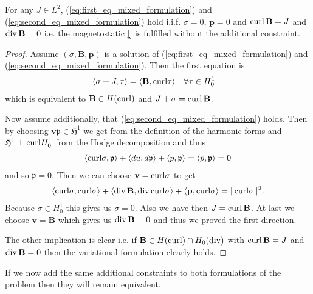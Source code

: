 \documentclass[../master_thesis.tex]{subfiles}
\begin{document}
\begin{proposition}
    For any $J \in L^2$, (\ref{eq:first_eq_mixed_formulation}) and 
    (\ref{eq:second_eq_mixed_formulation}) hold i.i.f. 
    $\sigma = 0$, $\mathbf{p}=0$ and $\operatorname{curl} \mathbf{B} = J$ and 
    $\operatorname{div} \mathbf{B} = 0$
    i.e. the magnetostatic \ref{}  is fulfilled without the additional 
    constraint.
\end{proposition}
\begin{proof}
    Assume $(\sigma,\mathbf{B},\mathbf{p})$ is a solution of (\ref{eq:first_eq_mixed_formulation}) and 
    (\ref{eq:second_eq_mixed_formulation}). Then the first equation is
    \begin{align*}
        \langle \sigma + J, \tau \rangle  
        &=  \langle \mathbf{B}, \mathbf{\operatorname{curl}}\tau \rangle  \quad \forall \tau \in H^1_0
    \end{align*}
    which is equivalent to $\mathbf{B} \in H(\operatorname{curl})$ and $J + \sigma = \operatorname{curl} \mathbf{B}$.

    Now assume additionally, that  
    (\ref{eq:second_eq_mixed_formulation}) holds. Then by choosing $\mathbf{v} \mathfrak{p} \in \mathfrak{H}^1$
    we get from the definition of the harmonic forms 
    and $\mathfrak{H}^1 \perp \mathbf{\operatorname{curl}} H^1_0$ from the Hodge decomposition and thus
    \begin{align*}
        \langle \mathbf{\operatorname{curl}} \sigma, \mathfrak{p} \rangle + \langle du, d\mathfrak{p} \rangle + \langle p, \mathfrak{p} \rangle
        = \langle p, \mathfrak{p} \rangle = 0
    \end{align*}
    and so $\mathfrak{p} = 0$. Then we can choose $\mathbf{v} = \mathbf{\operatorname{curl}} \sigma$ to get 
    \begin{align*}
        \langle \mathbf{\operatorname{curl}} \sigma, \mathbf{\operatorname{curl}} \sigma \rangle + \langle \operatorname{div} \mathbf{B}, \operatorname{div} \mathbf{\operatorname{curl}} \sigma \rangle 
            + \langle \mathbf{p}, \mathbf{\operatorname{curl}} \sigma \rangle
        = \lVert \mathbf{\operatorname{curl}} \sigma \rVert^2.
    \end{align*}
    Because $\sigma \in H^1_0$ this gives us $\sigma = 0$. Also we have then 
    $J = \operatorname{curl} \mathbf{B}$. At last we choose $\mathbf{v} = \mathbf{B}$ which gives us 
    $\operatorname{div} \mathbf{B} = 0$ and thus we proved the first direction. 

    The other implication is clear i.e. if $\mathbf{B} \in H(\operatorname{curl}) \cap H_0(\operatorname{div})$
    with $\operatorname{curl} \mathbf{B} = J$ and $\operatorname{div} \mathbf{B} = 0$ then the variational 
    formulation clearly holds.
    \end{proof}
If we now add the same additional constraints to both formulations of the problem 
then they will remain equivalent.
\end{document}
